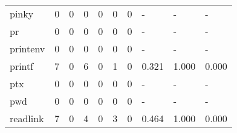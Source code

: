 \begin{longtable}{lp{1.3cm}p{1.3cm}p{1.3cm}p{1.3cm}p{1.3cm}p{1.3cm}p{1.3cm}p{1.3cm}p{1.3cm}}
pinky     &                      0 &                                  0 &                                 0 &                                0 &                                 0 &                               0 &                                    - &                                      - &                                    - \\
pr        &                      0 &                                  0 &                                 0 &                                0 &                                 0 &                               0 &                                    - &                                      - &                                    - \\
printenv  &                      0 &                                  0 &                                 0 &                                0 &                                 0 &                               0 &                                    - &                                      - &                                    - \\
printf    &                      7 &                                  0 &                                 6 &                                0 &                                 1 &                               0 &                                0.321 &                                  1.000 &                                0.000 \\
ptx       &                      0 &                                  0 &                                 0 &                                0 &                                 0 &                               0 &                                    - &                                      - &                                    - \\
pwd       &                      0 &                                  0 &                                 0 &                                0 &                                 0 &                               0 &                                    - &                                      - &                                    - \\
readlink  &                      7 &                                  0 &                                 4 &                                0 &                                 3 &                               0 &                                0.464 &                                  1.000 &                                0.000 \\

\end{longtable}

